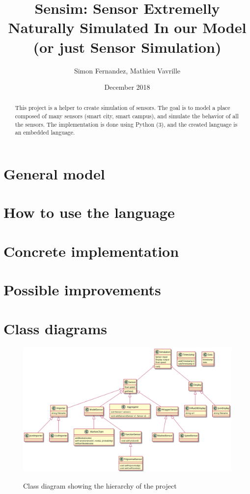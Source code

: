 \documentclass[a4paper,11pt]{article}
\title{Sensim: Sensor Extremelly Naturally Simulated In our Model (or just Sensor Simulation)}
\author{Simon Fernandez, Mathieu Vavrille}
\date{December 2018}
\begin{document}
\maketitle

\begin{abstract}
  This project is a helper to create simulation of sensors. The goal is to model a place composed of many sensors (smart city, smart campus), and simulate the behavior of all the sensors. The implementation is done using Python (3), and the created language is an embedded language.
\end{abstract}


\section{General model}





\section{How to use the language}







\section{Concrete implementation}






\section{Possible improvements}




\appendix

\section{Class diagrams}



\begin{figure}[!ht]
  \centering
  \includegraphics[scale = 0.30]{figures/meta-model.png}
  \label{meta-model_fig}
  \caption{Class diagram showing the hierarchy of the project}
\end{figure}
\end{document}
